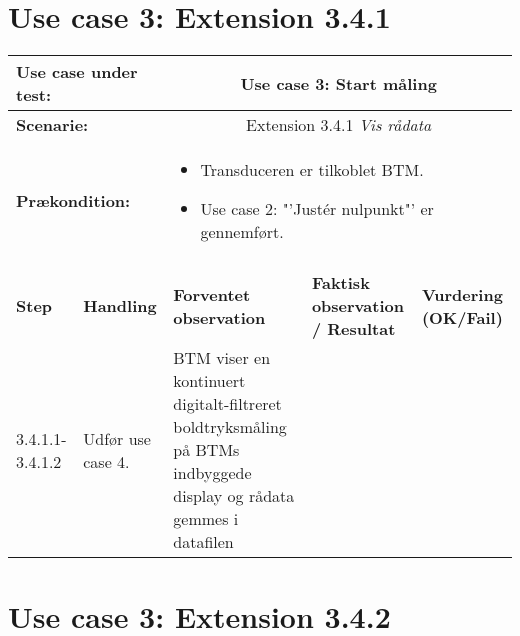 \section{Use case 3: Extension 3.4.1}
\begin{tabular}{|p{1cm}|p{3cm}|p{4cm}|p{4cm}|p{2cm}|}
\hline
\multicolumn{2}{|p{3cm}|}{\textbf{Use case under test:}} & \multicolumn{3}{c|}{Use case 3: Start måling} \\\hline

\multicolumn{2}{|p{3cm}|}{\textbf{Scenarie:}} & \multicolumn{3}{c|}{Extension 3.4.1 \textit{Vis rådata}} \\\hline

\multicolumn{2}{|p{3cm}|}{\textbf{Prækondition:}}  & \multicolumn{3}{l|}{\parbox{0.6\textwidth}{
\begin{itemize}[label=$\circ$]
\item Transduceren er tilkoblet BTM.
\item Use case 2: "'Justér nulpunkt"' er gennemført.  
\end{itemize} }}\\\hline

\multicolumn{5}{|c|}{} \\\hline

\textbf{Step} & \textbf{Handling} & \textbf{Forventet observation} & \textbf{Faktisk observation / Resultat} & \textbf{Vurdering (OK/Fail)}\\\hline

3.4.1.1-3.4.1.2 & Udfør use case 4. & BTM viser en kontinuert digitalt-filtreret boldtryksmåling på BTMs indbyggede display og rådata gemmes i datafilen &  & \\\hline
\end{tabular}


\section{Use case 3: Extension 3.4.2}

